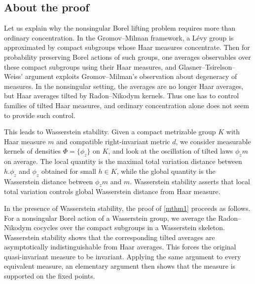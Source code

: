 \documentclass{amsart}
\numberwithin{equation}{subsection}
\theoremstyle{plain}
\theoremstyle{definition}
\theoremstyle{plain}
\begin{document}
\subsection{About the proof}

Let us explain why the nonsingular Borel lifting problem requires more than ordinary concentration. In the Gromov--Milman framework, a L\'{e}vy group is approximated by compact subgroups whose Haar measures concentrate. Then for probability preserving Borel actions of such groups, one averages observables over these compact subgroups using their Haar measures, and Glasner--Tsirelson--Weiss' argument exploits Gromov--Milman's observation about degeneracy of measures. In the nonsingular setting, the averages are no longer Haar averages, but Haar averages tilted by Radon--Nikodym kernels. Thus one has to control families of tilted Haar measures, and ordinary concentration alone does not seem to provide such control.

\smallskip

This leads to Wasserstein stability. Given a compact metrizable group \(K\) with Haar measure \(m\) and compatible right-invariant metric \(d\), we consider measurable kernels of densities \(\Phi=\{\phi_{z}\}\) on \(K\), and look at the oscillation of tilted laws \(\phi_{z}m\) on average. The local quantity is the maximal total variation distance between \(h.\phi_{z}\) and \(\phi_{z}\) obtained for small \(h\in K\), while the global quantity is the Wasserstein distance between \(\phi_{z}m\) and \(m\). Wasserstein stability asserts that local total variation controls global Wasserstein distance from Haar measure.

\smallskip

In the presence of Wasserstein stability, the proof of \cref{mthm1} proceeds as follows. For a nonsingular Borel action of a Wasserstein group, we average the Radon--Nikodym cocycles over the compact subgroups in a Wasserstein skeleton. Wasserstein stability shows that the corresponding tilted averages are asymptotically indistinguishable from Haar averages. This forces the original quasi-invariant measure to be invariant. Applying the same argument to every equivalent measure, an elementary argument then shows that the measure is supported on the fixed points.

\smallskip
\end{document}

